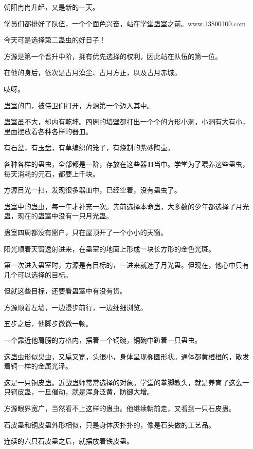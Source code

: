 
\begin{this_body}

朝阳冉冉升起，又是新的一天。

学员们都排好了队伍，一个个面色兴奋，站在学堂蛊室之前。www.13800100.com

今天可是选择第二蛊虫的好日子！

方源是第一个晋升中阶，拥有优先选择的权利，因此站在队伍的第一位。

在他的身后，依次是古月漠尘、古月方正，以及古月赤城。

吱呀。

蛊室的门，被侍卫们打开，方源第一个迈入其中。

蛊室虽不大，却内有乾坤。四周的墙壁都打出一个个的方形小洞，小洞有大有小，里面摆放着各种各样的器皿。

有石盆，有玉盘，有草编织的笼子，有烧制的紫砂陶壶。

各种各样的蛊虫，全部都是一阶，存放在这些器皿当中。学堂为了喂养这些蛊虫，每天消耗的元石，都要上千块。

方源目光一扫，发现很多器皿中，已经空着，没有蛊虫了。

蛊室中的蛊虫，每一年才补充一次。先前选择本命蛊，大多数的少年都选择了月光蛊，现在的蛊室中没有一只月光蛊。

蛊室四周都没有窗户，只在屋顶开了一个小小的天窗。

阳光顺着天窗透射进来，在蛊室的地面上形成一块长方形的金色光斑。

第一次进入蛊室时，方源是有目标的，一进来就选了月光蛊。但现在，他心中只有几个可以选择的目标。

但就这些目标，还要看蛊室中有没有货。

方源顺着左墙，一边漫步前行，一边细细浏览。

五步之后，他脚步微微一顿。

一个靠近他肩膀的方格内，摆着一个铜碗，铜碗中趴着一只蛊虫。

这蛊虫形似臭虫，又扁又宽，头很小，身体呈现椭圆形状。通体都黄橙橙的，散发着铜一样的金属光泽。

这是一只铜皮蛊。近战蛊师常常选择的对象。学堂的拳脚教头，就是养育了这么一只铜皮蛊，一旦催动，就是浑身泛黄，防御大增。

方源眼界宽广，当然看不上这样的蛊虫。他继续朝前走，又看到一只石皮蛊。

石皮蛊和铜皮蛊外形相似，只是身体灰扑扑的，像是石头做的工艺品。

连续的六只石皮蛊之后，就摆放着铁皮蛊。


\end{this_body}
